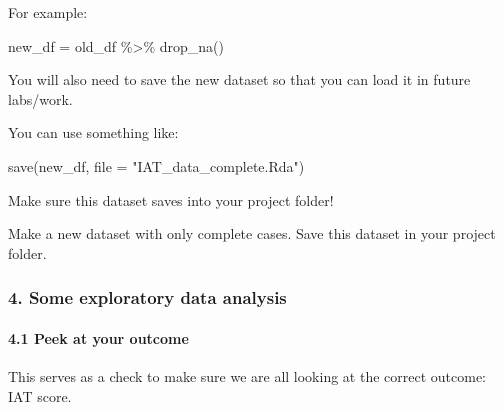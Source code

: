 \documentclass[
  letterpaper,
  DIV=11,
  numbers=noendperiod]{scrartcl}
\let\oldparagraph\paragraph
\renewcommand{\paragraph}[1]{\oldparagraph{#1}\mbox{}}
\newenvironment{Shaded}{\begin{snugshade}}{\end{snugshade}}
\newcommand{\AttributeTok}[1]{\textcolor[rgb]{0.40,0.45,0.13}{#1}}
\newcommand{\FunctionTok}[1]{\textcolor[rgb]{0.28,0.35,0.67}{#1}}
\newcommand{\NormalTok}[1]{\textcolor[rgb]{0.00,0.23,0.31}{#1}}
\newcommand{\OtherTok}[1]{\textcolor[rgb]{0.00,0.23,0.31}{#1}}
\newcommand{\SpecialCharTok}[1]{\textcolor[rgb]{0.37,0.37,0.37}{#1}}
\newcommand{\StringTok}[1]{\textcolor[rgb]{0.13,0.47,0.30}{#1}}
\begin{document}
For example:

\begin{Shaded}
\begin{Highlighting}[]
\NormalTok{new\_df }\OtherTok{=}\NormalTok{ old\_df }\SpecialCharTok{\%\textgreater{}\%} \FunctionTok{drop\_na}\NormalTok{()}
\end{Highlighting}
\end{Shaded}

You will also need to save the new dataset so that you can load it in
future labs/work.

You can use something like:

\begin{Shaded}
\begin{Highlighting}[]
\FunctionTok{save}\NormalTok{(new\_df, }\AttributeTok{file =} \StringTok{"IAT\_data\_complete.Rda"}\NormalTok{)}
\end{Highlighting}
\end{Shaded}

Make sure this dataset saves into your project folder!

\begin{tcolorbox}[enhanced jigsaw, colframe=quarto-callout-important-color-frame, arc=.35mm, colbacktitle=quarto-callout-important-color!10!white, bottomrule=.15mm, left=2mm, breakable, opacitybacktitle=0.6, rightrule=.15mm, opacityback=0, bottomtitle=1mm, coltitle=black, leftrule=.75mm, toptitle=1mm, titlerule=0mm, title=\textcolor{quarto-callout-important-color}{\faExclamation}\hspace{0.5em}{Task}, toprule=.15mm, colback=white]

Make a new dataset with only complete cases. Save this dataset in your
project folder.

\end{tcolorbox}

\hypertarget{some-exploratory-data-analysis}{%
\subsubsection{4. Some exploratory data
analysis}\label{some-exploratory-data-analysis}}

\hypertarget{peek-at-your-outcome}{%
\paragraph{4.1 Peek at your outcome}\label{peek-at-your-outcome}}

This serves as a check to make sure we are all looking at the correct
outcome: IAT score.
\end{document}
